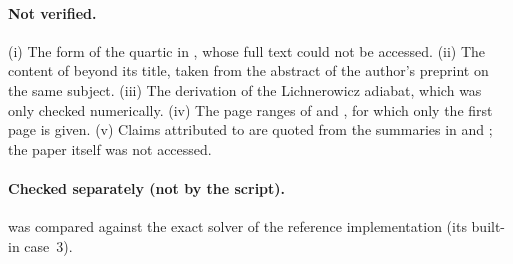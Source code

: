 \documentclass[11pt,a4paper,oneside,openany]{book}
\newcommand{\textcite}{\citet}
\theoremstyle{definition}
\theoremstyle{plain}
\theoremstyle{remark}
\begin{document}
\paragraph{Not verified.} (i) The form of the quartic in \textcite{Leismann2005}, whose full
text could not be accessed. (ii) The content of \textcite{Komissarov2003} beyond its title,
taken from the abstract of the author's preprint on the same subject. (iii) The derivation of
the Lichnerowicz adiabat, which was only checked numerically. (iv) The page ranges of
\textcite{Thorne1973} and \textcite{RyuJones1995}, for which only the first page is given.
(v) Claims attributed to \textcite{Komissarov1997} are quoted from the summaries in
\textcite{MignoneBodo2006} and \textcite{MignoneUglianoBodo2009}; the paper itself was not
accessed.

\paragraph{Checked separately (not by the script).}  was compared against
the exact solver of the reference implementation (its built-in case~3).


\backmatter


\end{document}

